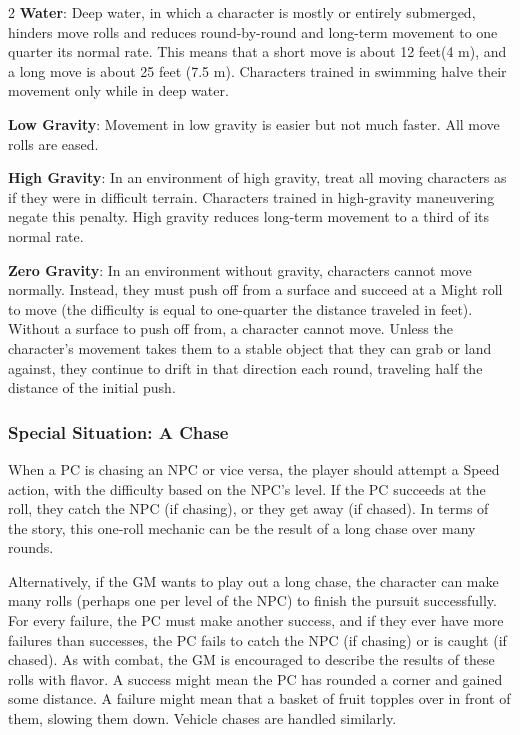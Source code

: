 \begin{multicols}{2}
\textbf{Water}: Deep water, in which a character is mostly or entirely submerged, hinders move rolls
and reduces round-by-round and long-term movement to one quarter its normal rate. This means that a short move is about 12 feet(4 m),
and a long move is about 25 feet (7.5 m). Characters trained in swimming halve their movement only while in deep water.

\textbf{Low Gravity}: Movement in low gravity is easier but not much faster. All move rolls are eased. 

\textbf{High Gravity}: In an environment of high gravity, treat all moving characters as if they were in difficult terrain. Characters trained in
high-gravity maneuvering negate this penalty. High gravity reduces long-term movement to a third of its normal rate.

\textbf{Zero Gravity}: In an environment without gravity, characters cannot move normally. Instead, they must push off from a surface and succeed at a Might roll to move (the difficulty is equal to one-quarter the distance traveled in feet). Without a surface to push off from, a character cannot move. Unless the character’s movement takes them to a stable object that they can grab or land against, they continue to drift in that direction each round, traveling half the distance of the initial push. 

\subsubsection{Special Situation: A Chase} 

When a PC is chasing an NPC or vice versa, the player should attempt a Speed action, with the difficulty based on the NPC’s level. If the PC succeeds at the roll, they catch the NPC (if chasing), or they get away (if chased). In terms of the story, this one-roll mechanic can be the result of a long chase over many rounds.

Alternatively, if the GM wants to play out a long chase, the character can make many rolls (perhaps one per level of the NPC) to finish the pursuit successfully. For every failure, the PC must make another success, and if they ever have more failures than successes, the PC fails to catch the NPC (if chasing) or is caught (if chased). As with combat, the GM is encouraged to describe the results of these rolls with flavor. A success might mean the PC has rounded a corner and gained some distance. A failure might mean that a basket of fruit topples over in front of them, slowing them down. Vehicle chases are handled similarly.


\end{multicols}
